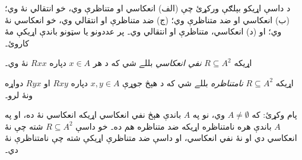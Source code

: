 \documentclass[../../../include/open-logic-section]{subfiles}
\begin{document}
\begin{prob}
د داسې اړيکو بېلګې ورکړئ چې (الف) انعکاسي او متناظرې وي، خو انتقالي
نۀ وي؛ (ب) انعکاسي او ضد متناظرې وي؛ (ج) ضد متناظرې او انتقالي وي،
خو انعکاسي نۀ وي؛ او (د) انعکاسي، متناظرې او انتقالي وي۔ پر عددونو
يا سټونو باندې اړيکې مۀ کاروئ۔
\end{prob}

\begin{defn}
اړيکه $R \subseteq A^2$ \emph{نفي انعکاسي} بللے شي که د هر
$x \in A$ دپاره $Rxx$ نۀ وي۔
\end{defn}

\begin{defn}[نامتناظرتيا]
اړيکه $R \subseteq A^2$ \emph{نامتناظره} بللے شي که د هېڅ جوړې
$x,y\in A$ دپاره $Rxy$ او $Ryx$ دواړه ونۀ لرو۔
\end{defn}

پام وکړئ: که $A \neq \emptyset$ وي، نو په $A$ باندې هېڅ نفي انعکاسي
اړيکه انعکاسي نۀ ده، او په $A$ باندې هره نامتناظره اړيکه ضد متناظره
هم ده۔ خو داسې $R \subseteq A^2$ شته چې نۀ انعکاسي دي او نۀ نفي
انعکاسي، او داسې ضد متناظرې اړيکې شته چې نامتناظرې نۀ دي۔
\end{document}

